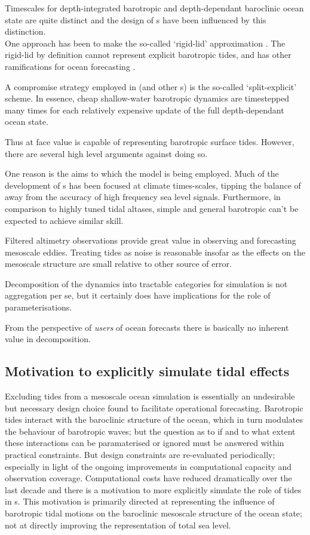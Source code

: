 Timescales for depth-integrated barotropic and depth-dependant baroclinic ocean state are quite distinct and the design of \OGCM{}s have been influenced by this distinction. \\
One approach has been to make the so-called `rigid-lid' approximation \cite[pp128]{gill1982atmosphere}. 
The rigid-lid by definition cannot represent explicit barotropic tides, and has other ramifications for ocean forecasting \cite[pp19]{Griffies:2004vs}.


A compromise strategy employed in \MOM{} (and other \OGCM{}s) is the so-called `split-explicit' scheme.    
In essence, cheap shallow-water barotropic dynamics are timestepped many times for each relatively expensive update of the full depth-dependant ocean state.  

Thus \MOM{} at face value is capable of representing barotropic surface tides.   However, there are several high level arguments against doing so.

One reason is the aims to which the model is being employed.  Much of the development of \OGCM{}s has been focused at climate times-scales, tipping the balance of away from the accuracy of high frequency sea level signals.   
Furthermore, in comparison to highly tuned tidal altases, simple and general barotropic can't be expected to achieve similar skill.


Filtered altimetry observations provide great value in observing and forecasting mesoscale eddies.
Treating tides as noise is reasonable insofar as the effects on the mesoscale structure are small relative to other source of error.


Decomposition of the dynamics into tractable categories for simulation is not aggregation per se, but it certainly does have implications for the role of parameterisations.  

From the perspective of \emph{users} of ocean forecasts there is basically no inherent value in decomposition.   
 
\subsection{Motivation to explicitly simulate tidal effects}

Excluding tides from a mesoscale ocean simulation is essentially an undesirable but necessary design choice found to facilitate operational forecasting.
Barotropic tides interact with the baroclinic structure of the ocean, which in turn modulates the behaviour of barotropic waves; but the question as to if and to what extent these interactions can be paramaterised or ignored must be answered within practical constraints.
But design constraints are re-evaluated periodically; especially in light of the ongoing improvements in computational capacity and observation coverage.
Computational costs have reduced dramatically over the last decade and there is a motivation  to more explicitly simulate the role of tides in \OGCM{}s.
This motivation is primarily directed at representing the influence of barotropic tidal motions on the baroclinic mesoscale structure of the ocean state; not at directly improving the representation of total sea level.

